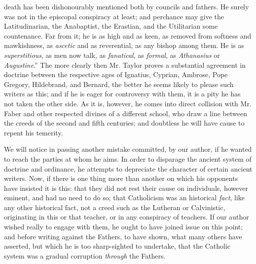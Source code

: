 death has been dishonourably mentioned both by councils and fathers. He
surely was not in the episcopal conspiracy at least; and perchance may
give the Latitudinarian, the Anabaptist, the Erastian, and the
Utilitarian some countenance. Far from it; he is as high and as keen, as
removed from softness and mawkishness, as \emph{ascetic} and as
reverential, as any bishop among them. He is as \emph{superstitious}, as
men now talk, as \emph{fanatical}, as \emph{formal}, as \emph{Athanasius}
or \emph{Augustine}.'' The more clearly then Mr. Taylor proves a
substantial agreement in doctrine between the respective ages of
Ignatius, Cyprian, Ambrose, Pope Gregory, Hildebrand, and Bernard, the
better he seems likely to please such writers as this; and if he is
eager for controversy with them, it is a pity he has not taken the other
side. As it is, however, he comes into direct collision with Mr. Faber
and other respected divines of a different school, who draw a line
between the creeds of the second and fifth centuries; and doubtless he
will have cause to repent his temerity.

We will notice in passing another mistake
committed, by our author, if he wanted to reach the parties at whom he
aims. In order to disparage the ancient system of doctrine and
ordinance, he attempts to depreciate the character of certain ancient
writers. Now, if there is one thing more than another on which his
opponents have insisted it is this: that they did not rest their cause
on individuals, however eminent, and had no need to do so; that
Catholicism was an historical \emph{fact}, like any other historical
fact, not a creed such as the Lutheran or Calvinistic, originating in
this or that teacher, or in any conspiracy of teachers. If our author
wished really to engage with them, he ought to have joined issue on this
point; and before writing against the Fathers, to have shown, what many
others have asserted, but which he is too sharp-sighted to
undertake, that the Catholic system was a gradual corruption \emph{through}
the Fathers.

